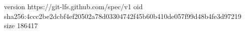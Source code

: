 version https://git-lfs.github.com/spec/v1
oid sha256:4ccc2be2dcbf4ef20502a78d03304742f45b60b410de057f99d48b4fe3d97219
size 186417
